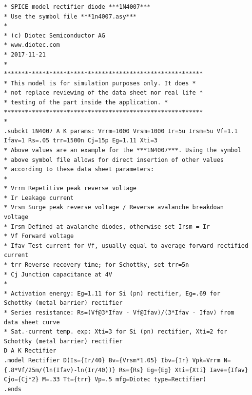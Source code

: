 \documentclass[12pt,a4paper,twoside]{article}
\begin{document}
\begin{tcolorbox}[
    colback=gray!10,
    colframe=black,
    title={Modelo Spice do Díodo 1N4007},
    breakable
]
\begin{lstlisting}
* SPICE model rectifier diode ***1N4007***
* Use the symbol file ***1n4007.asy***
*
* (c) Diotec Semiconductor AG
* www.diotec.com
* 2017-11-21
*
*********************************************************
* This model is for simulation purposes only. It does *
* not replace reviewing of the data sheet nor real life *
* testing of the part inside the application. *
*********************************************************
*
.subckt 1N4007 A K params: Vrrm=1000 Vrsm=1000 Ir=5u Irsm=5u Vf=1.1 Ifav=1 Rs=.05 trr=1500n Cj=15p Eg=1.11 Xti=3
* Above values are an example for the ***1N4007***. Using the symbol
* above symbol file allows for direct insertion of other values
* according to these data sheet parameters:
*
* Vrrm Repetitive peak reverse voltage
* Ir Leakage current
* Vrsm Surge peak reverse voltage / Reverse avalanche breakdown voltage
* Irsm Defined at avalanche diodes, otherwise set Irsm = Ir
* Vf Forward voltage
* Ifav Test current for Vf, usually equal to average forward rectified current
* trr Reverse recovery time; for Schottky, set trr=5n
* Cj Junction capacitance at 4V
*
* Activation energy: Eg=1.11 for Si (pn) rectifier, Eg=.69 for Schottky (metal barrier) rectifier
* Series resistance: Rs=(Vf@3*Ifav - Vf@Ifav)/(3*Ifav - Ifav) from data sheet curve
* Sat.-current temp. exp: Xti=3 for Si (pn) rectifier, Xti=2 for Schottky (metal barrier) rectifier
D A K Rectifier
.model Rectifier D(Is={Ir/40} Bv={Vrsm*1.05} Ibv={Ir} Vpk=Vrrm N={.8*Vf/25m/(ln(Ifav)-ln(Ir/40))} Rs={Rs} Eg={Eg} Xti={Xti} Iave={Ifav} Cjo={Cj*2} M=.33 Tt={trr} Vp=.5 mfg=Diotec type=Rectifier)
.ends
\end{lstlisting}
\end{tcolorbox}


\printbibliography[title={Referências}]

\newpage



\appendix
\appendixpage

\end{document}
